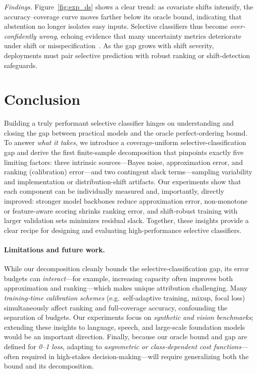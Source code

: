 \emph{Findings.} Figure~\ref{fig:exp_ds} shows a clear trend: as covariate shifts intensify, the accuracy–coverage curve moves farther below its oracle bound, indicating that abstention no longer isolates easy inputs. Selective classifiers thus become \emph{over-confidently wrong}, echoing evidence that many uncertainty metrics deteriorate under shift or misspecification~\citep{ovadia2019can}. As the gap grows with shift severity, deployments must pair selective prediction with robust ranking or shift-detection safeguards.

\section{Conclusion}
\label{sec:conclusion}

Building a truly performant selective classifier hinges on understanding and closing the gap between practical models and the oracle perfect-ordering bound.  To answer \emph{what it takes}, we introduce a coverage-uniform selective-classification gap and derive the first finite-sample decomposition that pinpoints exactly five limiting factors: three intrinsic sources—Bayes noise, approximation error, and ranking (calibration) error—and two contingent slack terms—sampling variability and implementation or distribution-shift artifacts.  Our experiments show that each component can be individually measured and, importantly, directly improved: stronger model backbones reduce approximation error, non-monotone or feature-aware scoring shrinks ranking error, and shift-robust training with larger validation sets minimizes residual slack.  Together, these insights provide a clear recipe for designing and evaluating high-performance selective classifiers.


\paragraph{Limitations and future work.}
While our decomposition cleanly bounds the selective‑classification gap, its error budgets can \emph{interact}—for example, increasing capacity often improves both approximation and ranking—which makes unique attribution challenging. Many \emph{training‑time calibration schemes} (e.g.\ self‑adaptive training, mixup, focal loss) simultaneously affect ranking and full‑coverage accuracy, confounding the separation of budgets. Our experiments focus on \emph{synthetic and vision benchmarks}; extending these insights to language, speech, and large‑scale foundation models would be an important direction. Finally, because our oracle bound and gap are defined for \emph{0–1 loss}, adapting to \emph{asymmetric or class‑dependent cost functions}---often required in high-stakes decision-making---will require generalizing both the bound and its decomposition.  